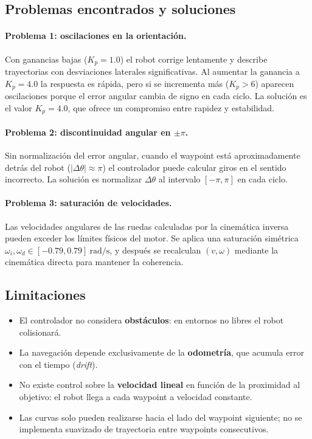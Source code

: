 \documentclass[12pt]{article}
\begin{document}
\subsection{Problemas encontrados y soluciones}

\paragraph{Problema 1: oscilaciones en la orientaci\'{o}n.}
Con ganancias bajas ($K_p = 1.0$) el robot corrige lentamente y describe trayectorias con desviaciones laterales significativas. Al aumentar la ganancia a $K_p = 4.0$ la respuesta es r\'{a}pida, pero si se incrementa m\'{a}s ($K_p > 6$) aparecen oscilaciones porque el error angular cambia de signo en cada ciclo. La soluci\'{o}n es el valor $K_p = 4.0$, que ofrece un compromiso entre rapidez y estabilidad.

\paragraph{Problema 2: discontinuidad angular en $\pm\pi$.}
Sin normalizaci\'{o}n del error angular, cuando el waypoint est\'{a} aproximadamente detr\'{a}s del robot ($|\Delta\theta| \approx \pi$) el controlador puede calcular giros en el sentido incorrecto. La soluci\'{o}n es normalizar $\Delta\theta$ al intervalo $[-\pi, \pi]$ en cada ciclo.

\paragraph{Problema 3: saturaci\'{o}n de velocidades.}
Las velocidades angulares de las ruedas calculadas por la cinem\'{a}tica inversa pueden exceder los l\'{i}mites f\'{i}sicos del motor. Se aplica una saturaci\'{o}n sim\'{e}trica $\omega_i, \omega_d \in [-0.79, 0.79]~\si{\radian\per\second}$, y despu\'{e}s se recalculan $(v, \omega)$ mediante la cinem\'{a}tica directa para mantener la coherencia.

\subsection{Limitaciones}
\begin{itemize}[leftmargin=2em]
  \item El controlador no considera \textbf{obst\'{a}culos}: en entornos no libres el robot colisionar\'{a}.
  \item La navegaci\'{o}n depende exclusivamente de la \textbf{odometr\'{i}a}, que acumula error con el tiempo (\emph{drift}).
  \item No existe control sobre la \textbf{velocidad lineal} en funci\'{o}n de la proximidad al objetivo: el robot llega a cada waypoint a velocidad constante.
  \item Las curvas solo pueden realizarse hacia el lado del waypoint siguiente; no se implementa suavizado de trayectoria entre waypoints consecutivos.
\end{itemize}
\end{document}
